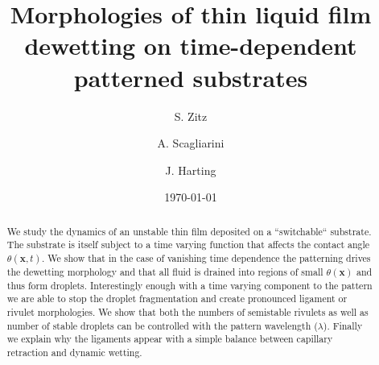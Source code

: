 \documentclass[twocolumn,amsmath,amssymb,showpacs,pre,nofootinbib,superscriptaddress]{revtex4-1} %
\begin{document}
\newcommand*\Diff[1]{\mathop{}\!\mathrm{d^#1}}


\title{Morphologies of thin liquid film dewetting on time-dependent patterned substrates}

\author{S. Zitz}
\author{A. Scagliarini}%
\author{J. Harting}
\date{\today}

\begin{abstract}
We study the dynamics of an unstable thin film deposited on a ``switchable`` substrate.
The substrate is itself subject to a time varying function that affects the contact angle $\theta(\mathbf{x},t)$.
We show that in the case of vanishing time dependence the patterning drives the dewetting morphology and that all fluid is drained into regions of small $\theta(\mathbf{x})$ and thus form droplets.
Interestingly enough with a time varying component to the pattern we are able to stop the droplet fragmentation and create pronounced ligament or rivulet morphologies.
We show that both the numbers of semistable rivulets as well as number of stable droplets can be controlled with the pattern wavelength ($\lambda$).
Finally we explain why the ligaments appear with a simple balance between capillary retraction and dynamic wetting.   
\end{abstract}
\end{document}
